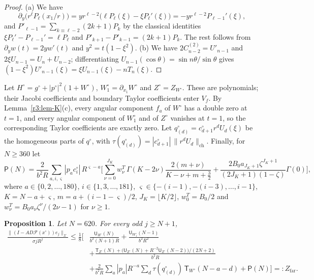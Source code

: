\documentclass[11pt]{amsart}
\newtheorem{proposition}[theorem]{Proposition}
\theoremstyle{definition}
\theoremstyle{remark}
\numberwithin{equation}{section}
\newcommand{\Fc}{\mathcal{F}}
\newcommand{\nrm}[1]{\lVert #1\rVert}
\begin{document}
\begin{proof}
(a) We have
\[
\partial_y\big(r^\ell P_\ell(x_1/r)\big)=yr^{\ell-2}\big(\ell P_\ell(\xi)-\xi P_\ell'(\xi)\big)=-yr^{\ell-2}P_{\ell-1}'(\xi),
\]
and $P'_{\ell-1}=\sum_{k\equiv\ell-2}(2k+1)P_k$ by the classical identities $\xi P_\ell'-P_{\ell-1}'=\ell P_\ell$ and $P'_{k+1}-P'_{k-1}=(2k+1)P_k$. The rest follows from $\partial_yw(t)=2yw'(t)$ and $y^2=t(1-\xi^2)$.
(b) We have $2C^{(2)}_{n-2}=U'_{n-1}$ and $2\xi U_{n-1}=U_n+U_{n-2}$; differentiating $U_{n-1}(\cos\theta)=\sin n\theta/\sin\theta$ gives $(1-\xi^2)U'_{n-1}(\xi)=\xi U_{n-1}(\xi)-nT_n(\xi)$.
\end{proof}

Let $H^\circ=g^\circ+|p^\circ|^2(1+W^\circ)$, $W^\circ_1=\partial_{x_1}W^\circ$ and $Z^\circ=Z_{W^\circ}$. These are polynomials; their Jacobi coefficients and boundary Taylor coefficients enter $V_f$. By Lemma~\ref{r3:lem-K}(c), every angular component $f_a$ of $W^\circ$ has a double zero at $t=1$, and every angular component of $W^\circ_1$ and of $Z^\circ$ vanishes at $t=1$, so the corresponding Taylor coefficients are exactly zero. Let $q^\circ_{(d)}=c^\circ_{d+1}r^dU_d(\xi)$ be the homogeneous parts of $q^\circ$, with $\tau(q^\circ_{(d)})=|c^\circ_{d+1}|\,\nrm{r^dU_d}_{\mathrm{ch}}$. Finally, for $N\geq360$ let
\[
\mathsf P(N)=\frac2{b^2R}\sum_{a,i,\varsigma}|p_ac^\circ_i|\,R^{\varsigma-a}\Big[\sum_{\nu=0}^{J_K}w^T_\nu\,\Gamma(K-2\nu)\frac{2(m+\nu)}{K-\nu+m+\frac32}+\frac{2B_0a_{J_K+1}\zeta^{J_K+1}}{(2J_K+1)(1-\zeta)}\Gamma(0)\Big],
\]
where $a\in\{0,2,\ldots,180\}$, $i\in\{1,3,\ldots,181\}$, $\varsigma\in\{-(i-1),-(i-3),\ldots,i-1\}$, $K=N-a+\varsigma$, $m=a+(i-1-\varsigma)/2$, $J_K=\lfloor K/2\rfloor$, $w^T_0=B_0/2$ and $w^T_\nu=B_0a_\nu\zeta^\nu/(2\nu-1)$ for $\nu\geq1$.

\begin{proposition}\label{r3:prop-farshape}
Let $N=620$. For every odd $j\geq N+1$,
\begin{align*}
\frac{\nrm{(I-AD\Fc(x^\circ))e_j}_{\mathcal X}}{\sigma jR^j}\leq\frac18\Big[&\frac{\mathsf U_{H^\circ}(N)}{b^2(N+1)R}+\frac{\mathsf U_{W^\circ_1}(N-1)}{b^2R^2}\\
&+\frac{\mathsf T_{Z^\circ}(N)+\big(\mathsf U_{Z^\circ}(N)+R^{-2}\mathsf U_{Z^\circ}(N-2)\big)/(2N+2)}{b^2R}\\
&+\frac2{b^2R}\sum_a|p_a|R^{-a}\sum_d\tau(q^\circ_{(d)})\,\mathsf T_{W^\circ}(N-a-d)+\mathsf P(N)\Big]=:Z_{\mathrm{far}} .
\end{align*}
\end{proposition}
\end{document}
